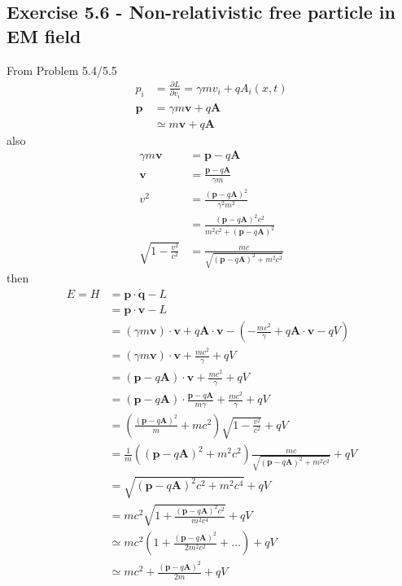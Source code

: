 \documentclass[../main.tex]{subfiles}
\begin{document}
\subsection*{Exercise 5.6 - Non-relativistic free particle in EM field}
From Problem 5.4/5.5
\begin{align}
p_i&=\frac{\partial L}{\partial v_i}
=\gamma mv_i+qA_i(x,t)\\
\mathbf{p}&=\gamma m\mathbf{v}+q\mathbf{A}\\
&\simeq m\mathbf{v}+q\mathbf{A}
\end{align}
also
\begin{align}
\gamma m\mathbf{v}&=\mathbf{p}-q\mathbf{A}\\
\mathbf{v}&=\frac{\mathbf{p}-q\mathbf{A}}{\gamma m}\\
v^2&=\frac{(\mathbf{p}-q\mathbf{A})^2}{\gamma^2 m^2}\\
&=\frac{(\mathbf{p}-q\mathbf{A})^2c^2}{m^2c^2+(\mathbf{p}-q\mathbf{A})^2}\\
\sqrt{1-\frac{v^2}{c^2}}&=\frac{mc}{\sqrt{(\mathbf{p}-q\mathbf{A})^2+m^2c^2}}
\end{align}
then
\begin{align}
E=H&=\mathbf{p}\cdot\dot{\mathbf{q}}-L\\
&=\mathbf{p}\cdot\mathbf{v}-L\\
&=(\gamma m \mathbf{v})\cdot\mathbf{v}+q\mathbf{A}\cdot\mathbf{v}-\left(-\frac{mc^2}{\gamma}+q\mathbf{A}\cdot\mathbf{v}-qV\right)\\
&=(\gamma m \mathbf{v})\cdot\mathbf{v}+\frac{mc^2}{\gamma}+qV\\
&=(\mathbf{p}-q\mathbf{A})\cdot\mathbf{v}+\frac{mc^2}{\gamma}+qV\\
&=(\mathbf{p}-q\mathbf{A})\cdot\frac{\mathbf{p}-q\mathbf{A}}{m\gamma}+\frac{mc^2}{\gamma}+qV\\
&=\left(\frac{(\mathbf{p}-q\mathbf{A})^2}{m}+mc^2\right)\sqrt{1-\frac{v^2}{c^2}}+qV\\
&=\frac{1}{m}\left((\mathbf{p}-q\mathbf{A})^2+m^2c^2\right)\frac{mc}{\sqrt{(\mathbf{p}-q\mathbf{A})^2+m^2c^2}}+qV\\
&=\sqrt{(\mathbf{p}-q\mathbf{A})^2c^2+m^2c^4}+qV\\
&=mc^2\sqrt{1+\frac{(\mathbf{p}-q\mathbf{A})^2c^2}{m^2c^4}}+qV\\
&\simeq mc^2\left(1+\frac{(\mathbf{p}-q\mathbf{A})^2}{2m^2c^2}+...\right)+qV\\
&\simeq mc^2+\frac{(\mathbf{p}-q\mathbf{A})^2}{2m}+qV
\end{align}
\end{document}
